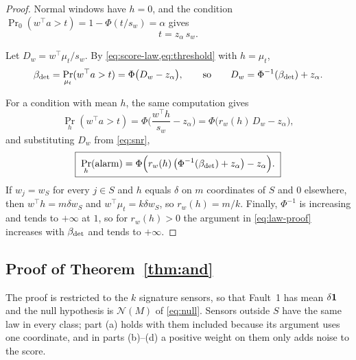 \begin{proof}
 Normal windows have $h=0$, and the condition $\Pr_0(w^\top a>t)=1-\Phi(t/s_w)=\alpha$ gives
\begin{equation}\label{eq:threshold}
  t=z_\alpha\,s_w .
\end{equation}

 Let $D_w=w^\top\mu_t/s_w$. By \cref{eq:score-law,eq:threshold} with $h=\mu_t$,
\begin{equation}\label{eq:snr}
  \beta_{\mathrm{det}}=\Pr_{\mu_t}(w^\top a>t)
  =\Phi\big(D_w-z_\alpha\big),
  \qquad\text{so}\qquad
  D_w=\Phi^{-1}(\beta_{\mathrm{det}})+z_\alpha .
\end{equation}

 For a condition with mean $h$, the same computation gives
\begin{equation}\label{eq:other}
  \Pr_h(w^\top a>t)
  =\Phi\Big(\frac{w^\top h}{s_w}-z_\alpha\Big)
  =\Phi\big(r_w(h)\,D_w-z_\alpha\big),
\end{equation}
and substituting $D_w$ from \cref{eq:snr},
\begin{equation}\label{eq:law-proof}
  \boxed{\;\Pr_h(\text{alarm})=\Phi\Big(r_w(h)\,\big(\Phi^{-1}(\beta_{\mathrm{det}})+z_\alpha\big)-z_\alpha\Big).\;}
\end{equation}
If $w_j=w_S$ for every $j\in S$ and $h$ equals $\delta$ on $m$ coordinates of $S$ and $0$ elsewhere, then $w^\top h=m\delta w_S$ and $w^\top\mu_t=k\delta w_S$, so $r_w(h)=m/k$. Finally, $\Phi^{-1}$ is increasing and tends to $+\infty$ at $1$, so for $r_w(h)>0$ the argument in \cref{eq:law-proof} increases with $\beta_{\mathrm{det}}$ and tends to $+\infty$.
\end{proof}

\subsection{Proof of Theorem~\ref*{thm:and}}\label{app:thm2}

The proof is restricted to the $k$ signature sensors, so that Fault~1 has mean $\delta\mathbf{1}$ and the null hypothesis is $\mathcal N(M)$ of \cref{eq:null}. Sensors outside $S$ have the same law in every class; part (a) holds with them included because its argument uses one coordinate, and in parts (b)--(d) a positive weight on them only adds noise to the score.

